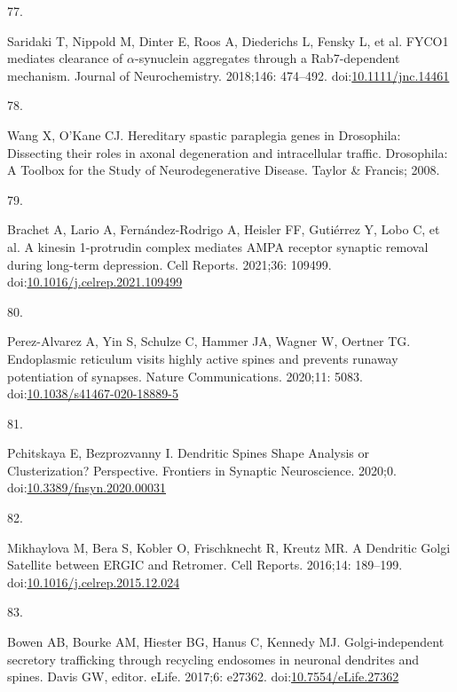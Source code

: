 \documentclass[
  12pt,
  a4paper,
]{book}
\newlength{\cslhangindent}
\newlength{\csllabelwidth}
\newlength{\cslentryspacingunit} %
\newenvironment{CSLReferences}[2] %
 {%
  \setlength{\parindent}{0pt}
  \ifodd #1
  \let\oldpar\par
  \def\par{\hangindent=\cslhangindent\oldpar}
  \fi
  \setlength{\parskip}{#2\cslentryspacingunit}
 }%
 {}
\newcommand{\CSLLeftMargin}[1]{\parbox[t]{\csllabelwidth}{#1}}
\newcommand{\CSLRightInline}[1]{\parbox[t]{\linewidth - \csllabelwidth}{#1}\break}
\begin{document}
\begin{CSLReferences}{0}{0}
\leavevmode{}%
\CSLLeftMargin{77. }%
\CSLRightInline{Saridaki T, Nippold M, Dinter E, Roos A, Diederichs L, Fensky L, et al. {FYCO1} mediates clearance of {\(\alpha\)}-synuclein aggregates through a {Rab7-dependent} mechanism. Journal of Neurochemistry. 2018;146: 474--492. doi:\href{https://doi.org/10.1111/jnc.14461}{10.1111/jnc.14461}}

\leavevmode{}%
\CSLLeftMargin{78. }%
\CSLRightInline{Wang X, O'Kane CJ. Hereditary spastic paraplegia genes in {Drosophila}: Dissecting their roles in axonal degeneration and intracellular traffic. Drosophila: {A Toolbox} for the {Study} of {Neurodegenerative Disease}. {Taylor \& Francis}; 2008. }

\leavevmode{}%
\CSLLeftMargin{79. }%
\CSLRightInline{Brachet A, Lario A, Fernández-Rodrigo A, Heisler FF, Gutiérrez Y, Lobo C, et al. A kinesin 1-protrudin complex mediates {AMPA} receptor synaptic removal during long-term depression. Cell Reports. 2021;36: 109499. doi:\href{https://doi.org/10.1016/j.celrep.2021.109499}{10.1016/j.celrep.2021.109499}}

\leavevmode{}%
\CSLLeftMargin{80. }%
\CSLRightInline{Perez-Alvarez A, Yin S, Schulze C, Hammer JA, Wagner W, Oertner TG. Endoplasmic reticulum visits highly active spines and prevents runaway potentiation of synapses. Nature Communications. 2020;11: 5083. doi:\href{https://doi.org/10.1038/s41467-020-18889-5}{10.1038/s41467-020-18889-5}}

\leavevmode{}%
\CSLLeftMargin{81. }%
\CSLRightInline{Pchitskaya E, Bezprozvanny I. Dendritic {Spines Shape Analysis}\textemdash{{Classification}} or {Clusterization}? {Perspective}. Frontiers in Synaptic Neuroscience. 2020;0. doi:\href{https://doi.org/10.3389/fnsyn.2020.00031}{10.3389/fnsyn.2020.00031}}

\leavevmode{}%
\CSLLeftMargin{82. }%
\CSLRightInline{Mikhaylova M, Bera S, Kobler O, Frischknecht R, Kreutz MR. A {Dendritic Golgi Satellite} between {ERGIC} and {Retromer}. Cell Reports. 2016;14: 189--199. doi:\href{https://doi.org/10.1016/j.celrep.2015.12.024}{10.1016/j.celrep.2015.12.024}}

\leavevmode{}%
\CSLLeftMargin{83. }%
\CSLRightInline{Bowen AB, Bourke AM, Hiester BG, Hanus C, Kennedy MJ. Golgi-independent secretory trafficking through recycling endosomes in neuronal dendrites and spines. Davis GW, editor. eLife. 2017;6: e27362. doi:\href{https://doi.org/10.7554/eLife.27362}{10.7554/eLife.27362}}


\end{CSLReferences}
\end{document}
